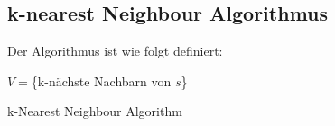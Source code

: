 \documentclass[fontsize=11pt]{scrartcl}
\begin{document}
            \subsection{k-nearest Neighbour Algorithmus}
                Der Algorithmus ist wie folgt definiert:\par
                \begin{algorithm}[H]
                    $V= $\{k-nächste Nachbarn von $s$\}\;
                    {
                        \;
                    }
                           
                    \caption{k-Nearest Neighbour Algorithm}
                \end{algorithm}
                            
\end{document}

